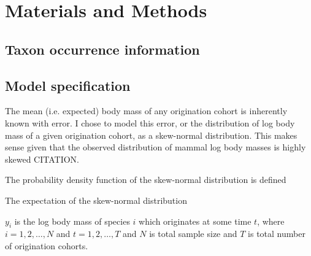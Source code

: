 \documentclass[12pt,letterpaper]{article}
\begin{document}
\section{Materials and Methods}

\subsection{Taxon occurrence information}

\subsection{Model specification}

The mean (i.e. expected) body mass of any origination cohort is inherently known with error. I chose to model this error, or the distribution of log body mass of a given origination cohort, as a skew-normal distribution. This makes sense given that the observed distribution of mammal log body masses is highly skewed CITATION.

The probability density function of the skew-normal distribution is defined

The expectation of the skew-normal distribution 

\(y_{i}\) is the log body mass of species \(i\) which originates at some time \(t\), where \(i = 1, 2, \dots, N\) and \(t = 1, 2, \dots, T\) and \(N\) is total sample size and \(T\) is total number of origination cohorts.
\end{document}
